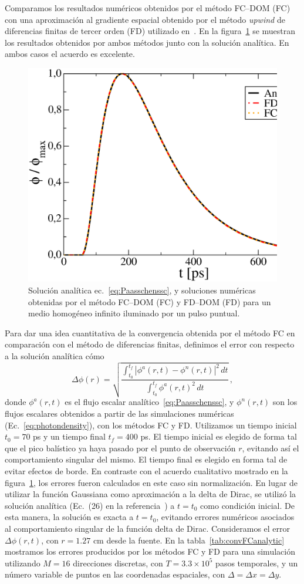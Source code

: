 Comparamos los resultados numéricos obtenidos por el método FC--DOM (FC)
con una aproximación al gradiente espacial obtenido por el método {\em upwind} 
de diferencias finitas de tercer orden (FD) utilizado en~\cite{Fujii2014}. 
En la figura~\ref{fig:analytic1} se muestran los resultados obtenidos por ambos métodos 
junto con la solución analítica. En ambos casos el acuerdo es excelente.

 \begin{figure}[h]
\centering
  \includegraphics[width=0.48\linewidth]{figuras/analytic1.eps}
  \caption{Solución analítica ec.~\eqref{eq:Paasschenssc}, 
  y soluciones numéricas obtenidas por el método FC--DOM (FC) 
  y FD--DOM (FD) para un medio homogéneo infinito iluminado 
  por un pulso puntual.}
 \label{fig:analytic1}
\end{figure}
 
Para dar una idea cuantitativa de la convergencia obtenida por el método 
FC en comparación con el método de diferencias finitas, 
definimos el error con respecto a la solución analítica cómo
\begin{equation}
\Delta \phi(r)= 
\sqrt{
\frac{ \int_{t_0}^{t_f} |\phi^a(r,t)-\phi^n(r,t)|^2 \,  dt}
{\int_{t_0}^{t_f} \phi^a(r,t)^2 \, dt } 
} \, , 
\end{equation}
donde $\phi^a(r,t)$ es el flujo escalar analítico~\eqref{eq:Paasschenssc}, 
y $\phi^n(r,t)$ son los flujos escalares obtenidos a partir de las 
simulaciones numéricas (Ec.~\eqref{eq:photondensity}), con los métodos FC y FD. 
Utilizamos un tiempo inicial $t_0=70$ ps y un tiempo final 
$t_f=400$ ps. El tiempo inicial es elegido de forma tal que el pico balístico 
ya haya pasado por el punto de observación $r$, evitando así el comportamiento 
singular del mismo. El tiempo final es elegido en forma tal 
de evitar efectos de borde. En contraste con el acuerdo 
cualitativo mostrado en la figura~\ref{fig:analytic1}, 
los errores fueron calculados en este caso sin normalización. 
En lugar de utilizar la función Gaussiana como aproximación a la delta de Dirac, 
se utilizó la solución analítica (Ec.~(26) en la referencia~\cite{Paasschens1997}) 
a $t=t_0$ como condición inicial. 
De esta manera, la solución es exacta a $t=t_0$, 
evitando errores numéricos asociados al comportamiento singular de la función 
delta de Dirac. 
Consideramos el error $\Delta \phi (r,t)$, con $r=1.27$ cm desde la fuente. 
En la tabla~\ref{tab:convFCanalytic} mostramos los errores producidos por los métodos FC y FD 
para una simulación utilizando $M=16$ direcciones discretas, con $T=3.3\times 10^5$ 
pasos temporales, y un número variable de puntos en las coordenadas espaciales, 
con $\Delta =\Delta x =\Delta y$.

